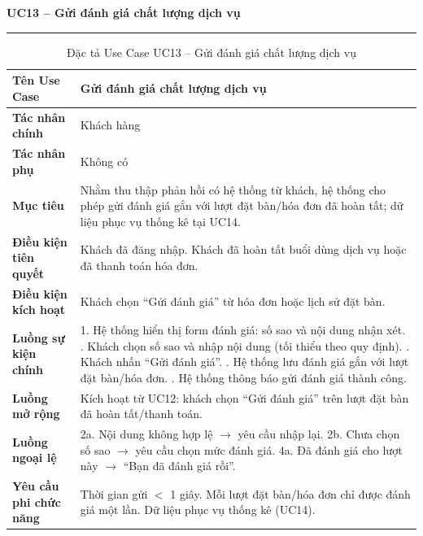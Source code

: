 ﻿\documentclass[../DoAn.tex]{subfiles}
\newcommand{\UCtitle}[1]{%
    \vspace{0.5em}
    {\large\bfseries #1}\\[-0.5em]
    \rule{\textwidth}{0.5pt}
    \vspace{0.3em}
}
\begin{document}
\begin{table}[H]
\UCtitle{UC13 – Gửi đánh giá chất lượng dịch vụ}
\centering
\begin{tabular}{|p{4cm}|p{10.2cm}|}
\hline
\textbf{Tên Use Case} & Gửi đánh giá chất lượng dịch vụ \\ \hline
\textbf{Tác nhân chính} & Khách hàng \\ \hline
\textbf{Tác nhân phụ} & Không có \\ \hline
\textbf{Mục tiêu} &
Nhằm thu thập phản hồi có hệ thống từ khách, hệ thống cho phép gửi đánh giá gắn với lượt đặt bàn/hóa đơn đã hoàn tất; dữ liệu phục vụ thống kê tại UC14.
\\ \hline
\textbf{Điều kiện tiên quyết} &
Khách đã đăng nhập. Khách đã hoàn tất buổi dùng dịch vụ hoặc đã thanh toán hóa đơn.
\\ \hline
\textbf{Điều kiện kích hoạt} &
Khách chọn ``Gửi đánh giá'' từ hóa đơn hoặc lịch sử đặt bàn.
\\ \hline
\textbf{Luồng sự kiện chính} &
1. Hệ thống hiển thị form đánh giá: số sao và nội dung nhận xét. \newline
2. Khách chọn số sao và nhập nội dung (tối thiểu theo quy định). \newline
3. Khách nhấn ``Gửi đánh giá''. \newline
4. Hệ thống lưu đánh giá gắn với lượt đặt bàn/hóa đơn. \newline
5. Hệ thống thông báo gửi đánh giá thành công.
\\ \hline
\textbf{Luồng mở rộng} &
Kích hoạt từ UC12: khách chọn ``Gửi đánh giá'' trên lượt đặt bàn đã hoàn tất/thanh toán.
\\ \hline
\textbf{Luồng ngoại lệ} &
2a. Nội dung không hợp lệ $\rightarrow$ yêu cầu nhập lại. \newline
2b. Chưa chọn số sao $\rightarrow$ yêu cầu chọn mức đánh giá. \newline
4a. Đã đánh giá cho lượt này $\rightarrow$ ``Bạn đã đánh giá rồi''.
\\ \hline
\textbf{Yêu cầu phi chức năng} &
Thời gian gửi $<$ 1 giây. Mỗi lượt đặt bàn/hóa đơn chỉ được đánh giá một lần. Dữ liệu phục vụ thống kê (UC14).
\\ \hline
\end{tabular}
\caption{Đặc tả Use Case UC13 – Gửi đánh giá chất lượng dịch vụ}
\end{table}
\end{document}
